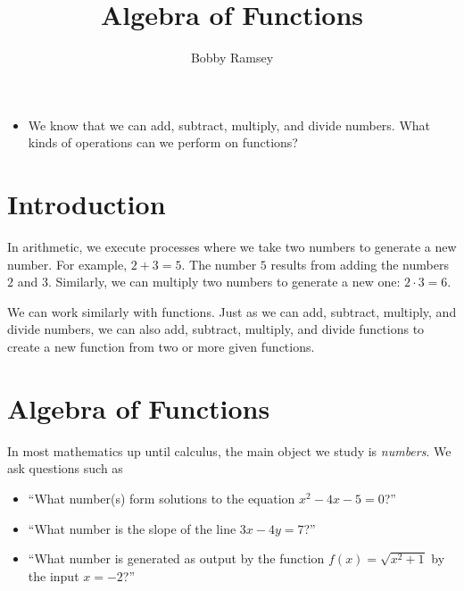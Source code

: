 \documentclass{ximera}
\author{Bobby Ramsey}
\title{Algebra of Functions}
\begin{document}
\begin{abstract}
  
\end{abstract}
\licenseAPC
\maketitle


\begin{motivatingQuestions} \begin{itemize}
	\item We know that we can add, subtract, multiply, and divide numbers. What kinds of operations can we perform on functions?
\end{itemize} \end{motivatingQuestions}



\section{Introduction}

	In arithmetic, we execute processes where we take two numbers to generate a new number. For example, 
	$2 + 3 = 5$. The number $5$ results from adding the numbers $2$ and $3$.
	Similarly, we can multiply two numbers to generate a new one: $2 \cdot 3 = 6$.
	
	We can work similarly with functions. Just as we can add, subtract, multiply, and divide numbers, we can also add, subtract, multiply, and divide 
	functions to create a new function from two or more given functions.

\section{Algebra of Functions}

	In most mathematics up until calculus, the main object we study is \emph{numbers}. We ask questions such as
	\begin{itemize}[label=\textbullet]
		\item ``What number(s) form solutions to the equation $x^2 - 4x - 5 = 0$?''\\
		\item ``What number is the slope of the line $3x - 4y = 7$?''\\
		\item ``What number is generated as output by the function $f(x) = \sqrt{x^2 + 1}$ by the input $x = -2$?''
	\end{itemize}
	
\end{document}
